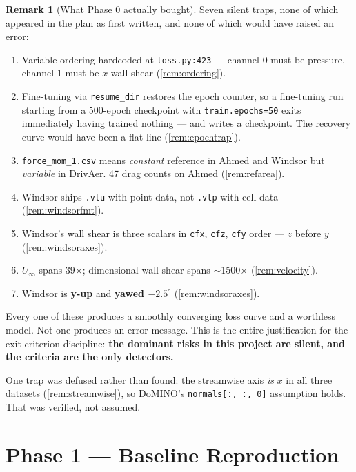 \documentclass[10pt,a4paper]{article}
\theoremstyle{definition}
\newtheorem{remark}{Remark}[section]
\begin{document}
\begin{remark}[What Phase 0 actually bought]
\label{rem:p0value}
Seven silent traps, none of which appeared in the plan as first written, and none of
which would have raised an error:

\begin{enumerate}[label=(\arabic*),leftmargin=2em]
  \item Variable ordering hardcoded at \texttt{loss.py:423} --- channel 0 must be
  pressure, channel 1 must be $x$-wall-shear (\cref{rem:ordering}).
  \item Fine-tuning via \texttt{resume\_dir} restores the epoch counter, so a
  fine-tuning run starting from a 500-epoch checkpoint with
  \texttt{train.epochs=50} exits immediately having trained nothing --- and writes a
  checkpoint. The recovery curve would have been a flat line (\cref{rem:epochtrap}).
  \item \texttt{force\_mom\_1.csv} means \emph{constant} reference in Ahmed and Windsor
  but \emph{variable} in DrivAer. 47 drag counts on Ahmed (\cref{rem:refarea}).
  \item Windsor ships \texttt{.vtu} with point data, not \texttt{.vtp} with cell data
  (\cref{rem:windsorfmt}).
  \item Windsor's wall shear is three scalars in \texttt{cfx}, \texttt{cfz},
  \texttt{cfy} order --- $z$ before $y$ (\cref{rem:windsoraxes}).
  \item $U_\infty$ spans 39$\times$; dimensional wall shear spans $\sim$1500$\times$
  (\cref{rem:velocity}).
  \item Windsor is \textbf{y-up} and \textbf{yawed $-2.5^\circ$}
  (\cref{rem:windsoraxes}).
\end{enumerate}

Every one of these produces a smoothly converging loss curve and a worthless model. Not
one produces an error message. This is the entire justification for the exit-criterion
discipline: \textbf{the dominant risks in this project are silent, and the criteria are
the only detectors.}

One trap was defused rather than found: the streamwise axis \emph{is} $x$ in all three
datasets (\cref{rem:streamwise}), so DoMINO's \texttt{normals[:, :, 0]} assumption holds.
That was verified, not assumed.
\end{remark}

\section{Phase 1 --- Baseline Reproduction}
\end{document}
